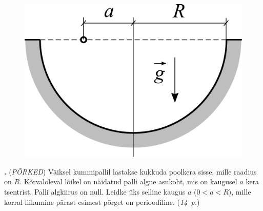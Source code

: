 \documentclass[11pt,a5paper]{article}
\newcommand{\numb}[1]{\vspace{5pt}\textbf{\large #1}}
\newcommand{\nimi}[1]{(\textsl{\small #1})}
\newcommand{\punktid}[1]{(\emph{#1~p.})}
\newcounter{ylesanne}
\newcommand{\yl}[1]{\addtocounter{ylesanne}{1}\numb{\theylesanne.} \nimi{#1} \newblock{}}
\newcommand{\autor}[1]{}%
\begin{document}
\begin{figure}
\vspace{-25pt}
  \begin{center}
    \includegraphics[width=\linewidth]{porked_fig.pdf}
  \end{center}
  \vspace{-1cm}
\end{figure}

\yl{PÕRKED} Väiksel kummipallil lastakse kukkuda poolkera sisse, mille raadius on $R$. Kõrvaloleval lõikel on näidatud palli algne asukoht, mis on kaugusel $a$ kera tsentrist. Palli algkiirus on null. Leidke üks selline kaugus $a$ ($0<a<R$), mille korral liikumine pärast esimest põrget on perioodiline.
\punktid{14} \autor{Päivo Simson}
\end{document}
